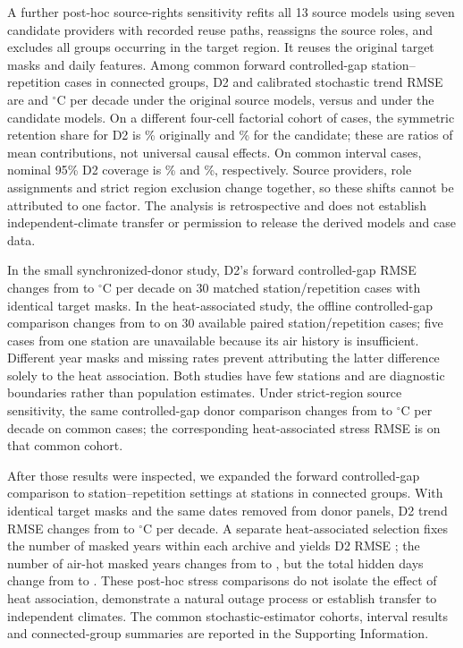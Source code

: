 \documentclass[draft,linenumbers]{agujournal2025}
\begin{document}
A further post-hoc source-rights sensitivity refits all 13 source models using seven candidate providers with recorded reuse paths, reassigns the source roles, and excludes all groups occurring in the target region. It reuses the original target masks and daily features. Among \OpenSourcePairs{} common forward controlled-gap station--repetition cases in \OpenSourceGroups{} connected groups, D2 and calibrated stochastic trend RMSE are \OpenSourceOldDTwo{} and \OpenSourceOldClassic{} $^{\circ}$C per decade under the original source models, versus \OpenSourceNewDTwo{} and \OpenSourceNewClassic{} under the candidate models. On a different four-cell factorial cohort of \OpenSourceFactorCases{} cases, the symmetric retention share for D2 is \OpenSourceOldRetention\% originally and \OpenSourceNewRetention\% for the candidate; these are ratios of mean contributions, not universal causal effects. On \OpenSourceCoverageCases{} common interval cases, nominal 95\% D2 coverage is \OpenSourceOldCoverage\% and \OpenSourceNewCoverage\%, respectively. Source providers, role assignments and strict region exclusion change together, so these shifts cannot be attributed to one factor. The analysis is retrospective and does not establish independent-climate transfer or permission to release the derived models and case data.

In the small synchronized-donor study, D2's forward controlled-gap RMSE changes from \WADonorBase{} to \WADonorStress{}$^{\circ}$C per decade on 30 matched station/repetition cases with identical target masks. In the heat-associated study, the offline controlled-gap comparison changes from \WAHeatBase{} to \WAHeatStress{} on 30 available paired station/repetition cases; five cases from one station are unavailable because its air history is insufficient. Different year masks and missing rates prevent attributing the latter difference solely to the heat association. Both studies have few stations and are diagnostic boundaries rather than population estimates. Under strict-region source sensitivity, the same controlled-gap donor comparison changes from \SRScenarioBaseNew{} to \SRDonorNew{}$^{\circ}$C per decade on \SRScenarioN{} common cases; the corresponding heat-associated stress RMSE is \SRHeatNew{} on that common cohort.

After those results were inspected, we expanded the forward controlled-gap comparison to \ESArchives{} station--repetition settings at \ESStations{} stations in \ESGroups{} connected groups. With identical target masks and the same dates removed from donor panels, D2 trend RMSE changes from \ESBaseline{} to \ESDonor{} $^{\circ}$C per decade. A separate heat-associated selection fixes the number of masked years within each archive and yields D2 RMSE \ESHeat{}; the number of air-hot masked years changes from \ESHotBaseline{} to \ESHotHeat{}, but the total hidden days change from \ESDaysBaseline{} to \ESDaysHeat{}. These post-hoc stress comparisons do not isolate the effect of heat association, demonstrate a natural outage process or establish transfer to independent climates. The common stochastic-estimator cohorts, interval results and connected-group summaries are reported in the Supporting Information.
\end{document}
